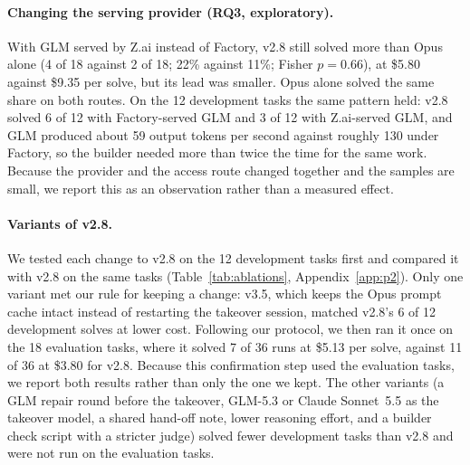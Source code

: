 \paragraph{Changing the serving provider (RQ3, exploratory).}
With GLM served by Z.ai instead of Factory, v2.8 still solved more than Opus alone (4 of 18 against 2 of 18;
22\% against 11\%; Fisher $p = 0.66$), at \$5.80 against \$9.35 per solve, but its lead was smaller. Opus alone solved the same
share on both routes. On the 12 development tasks the same pattern held: v2.8 solved 6 of 12 with
Factory-served GLM and 3 of 12 with Z.ai-served GLM, and GLM produced about 59 output tokens per second against
roughly 130 under Factory, so the builder needed more than twice the time for the same work. Because the
provider and the access route changed together and the samples are small, we report this as an observation
rather than a measured effect.

\paragraph{Variants of v2.8.}
We tested each change to v2.8 on the 12 development tasks first and compared it with v2.8 on the same tasks
(Table~\ref{tab:ablations}, Appendix~\ref{app:p2}). Only one variant met our rule for keeping a change: v3.5,
which keeps the Opus prompt cache intact instead of restarting the takeover session, matched v2.8's 6 of 12
development solves at lower cost. Following our protocol, we then ran it once on the 18 evaluation tasks, where it
solved 7 of 36 runs at \$5.13 per solve, against 11 of 36 at \$3.80 for v2.8. Because this confirmation step
used the evaluation tasks, we report both results rather than only the one we kept. The other variants (a GLM
repair round before the takeover, GLM-5.3 or Claude Sonnet~5.5 as the takeover model, a shared hand-off note,
lower reasoning effort, and a builder check script with a stricter judge) solved fewer development tasks than
v2.8 and were not run on the evaluation tasks.

